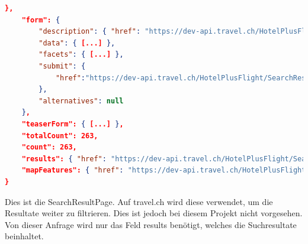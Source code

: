 \begin{lstlisting}[language=json,firstnumber=1]
    },
    "form": {
        "description": { "href": "https://dev-api.travel.ch/HotelPlusFlight/SearchResultPageFormDescription/19E2B6BB-1F06-4396-B86E-169EDB368B0E?searchResultPageId=E5241069-1272-4DD0-946E-46DD2E9D55E6" },
        "data": { [...] },
        "facets": { [...] },
        "submit": {
            "href":"https://dev-api.travel.ch/HotelPlusFlight/SearchResultPage/19E2B6BB-1F06-4396-B86E-169EDB368B0E{?paging.offset,paging.size,sortMethod.type,sortMethod.data,hotelName,ratings.minimal,ratings.maximal,prices.maximal.amount,prices.maximal.currency,prices.minimal.amount,prices.minimal.currency,hotelCategories*,mealTypeCategories*,hotelTypes*,keyFacts*,partsOfCity*,tourOperators*,flightRouteStopCounts*,flightRoute1DepartureDateTimes.minimal,flightRoute1DepartureDateTimes.maximal,flightRoute1ArrivalDateTimes.minimal,flightRoute1ArrivalDateTimes.maximal,flightRoute1DepartureAirports*,flightRoute1ArrivalAirports*,flightRoute2DepartureDateTimes.minimal,flightRoute2DepartureDateTimes.maximal,flightRoute2ArrivalDateTimes.minimal,flightRoute2ArrivalDateTimes.maximal,flightRoute2DepartureAirports*,flightRoute2ArrivalAirports*,airlines*,flightRouteDurations.minimal,flightRouteDurations.maximal,luggageOptions*}"
        },
        "alternatives": null
    },
    "teaserForm": { [...] },
    "totalCount": 263,
    "count": 263,
    "results": { "href": "https://dev-api.travel.ch/HotelPlusFlight/SearchResults/E5241069-1272-4DD0-946E-46DD2E9D55E6" },
    "mapFeatures": { "href": "https://dev-api.travel.ch/HotelPlusFlight/SearchResultPage/E5241069-1272-4DD0-946E-46DD2E9D55E6/Map" }
}
\end{lstlisting}
Dies ist die SearchResultPage. Auf travel.ch wird diese verwendet, um die Resultate weiter zu filtrieren. Dies ist jedoch bei diesem Projekt nicht vorgesehen. Von dieser Anfrage wird nur das Feld results benötigt, welches die Suchresultate beinhaltet.

